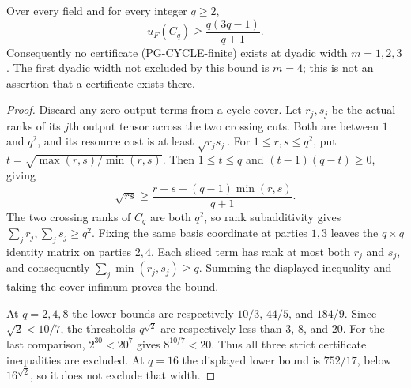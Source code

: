 \begin{proposition}
\label{pg:cycle-finite-lower}
Over every field and for every integer $q\geq2$,
\[
 u_F(C_q)\geq\frac{q(3q-1)}{q+1}.
 \tag{PG-CYCLE-rank-lower}
\]
Consequently no certificate (PG-CYCLE-finite) exists at dyadic
width $m=1,2,3$. The first dyadic width not excluded by this
bound is $m=4$; this is not an assertion that a certificate exists
there.
\end{proposition}
\begin{proof}
Discard any zero output terms from a cycle cover. Let $r_j,s_j$
be the actual ranks of its $j$th output tensor across the two
crossing cuts. Both are between $1$ and $q^2$, and its resource
cost is at least $\sqrt{r_js_j}$. For $1\leq r,s\leq q^2$, put
$t=\sqrt{\max(r,s)/\min(r,s)}$. Then $1\leq t\leq q$ and
$(t-1)(q-t)\geq0$, giving
\[
 \sqrt{rs}\geq
 \frac{r+s+(q-1)\min(r,s)}{q+1}.
\]
The two crossing ranks of $C_q$ are both $q^2$, so rank
subadditivity gives $\sum_jr_j,\sum_js_j\geq q^2$.
Fixing the same basis coordinate at parties $1,3$ leaves the
$q\times q$ identity matrix on parties $2,4$. Each sliced term
has rank at most both $r_j$ and $s_j$, and consequently
$\sum_j\min(r_j,s_j)\geq q$. Summing the displayed inequality
and taking the cover infimum proves the bound.

At $q=2,4,8$ the lower bounds are respectively $10/3$, $44/5$,
and $184/9$. Since $\sqrt2<10/7$, the thresholds $q^{\sqrt2}$
are respectively less than $3$, $8$, and $20$. For the last
comparison, $2^{30}<20^7$ gives $8^{10/7}<20$.
Thus all three strict certificate inequalities are excluded.
At $q=16$ the displayed lower bound is $752/17$, below
$16^{\sqrt2}$, so it does not exclude that width.
\end{proof}

